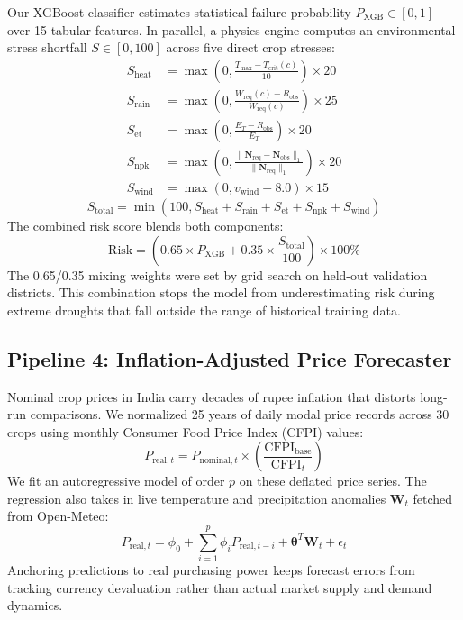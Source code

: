 \documentclass[conference]{IEEEtran}
\begin{document}
Our XGBoost classifier estimates statistical failure probability $P_{\text{XGB}} \in [0, 1]$ over 15 tabular features. In parallel, a physics engine computes an environmental stress shortfall $S \in [0, 100]$ across five direct crop stresses:
\begin{align}
S_{\text{heat}} &= \max\left(0, \frac{T_{\max} - T_{\text{crit}}(c)}{10}\right) \times 20 \\
S_{\text{rain}} &= \max\left(0, \frac{W_{\text{req}}(c) - R_{\text{obs}}}{W_{\text{req}}(c)}\right) \times 25 \\
S_{\text{et}}   &= \max\left(0, \frac{E_T - R_{\text{obs}}}{E_T}\right) \times 20 \\
S_{\text{npk}}  &= \max\left(0, \frac{\|\mathbf{N}_{\text{req}} - \mathbf{N}_{\text{obs}}\|_1}{\|\mathbf{N}_{\text{req}}\|_1}\right) \times 20 \\
S_{\text{wind}} &= \max\left(0, v_{\text{wind}} - 8.0\right) \times 15
\end{align}
\begin{equation}
S_{\text{total}} = \min(100, S_{\text{heat}} + S_{\text{rain}} + S_{\text{et}} + S_{\text{npk}} + S_{\text{wind}})
\end{equation}
The combined risk score blends both components:
\begin{equation}
\text{Risk} = \left(0.65 \times P_{\text{XGB}} + 0.35 \times \frac{S_{\text{total}}}{100}\right) \times 100\%
\end{equation}
The 0.65/0.35 mixing weights were set by grid search on held-out validation districts. This combination stops the model from underestimating risk during extreme droughts that fall outside the range of historical training data.

\subsection{Pipeline 4: Inflation-Adjusted Price Forecaster}
Nominal crop prices in India carry decades of rupee inflation that distorts long-run comparisons. We normalized 25 years of daily modal price records across 30 crops using monthly Consumer Food Price Index (CFPI) values:
\begin{equation}
P_{\text{real}, t} = P_{\text{nominal}, t} \times \left(\frac{\text{CFPI}_{\text{base}}}{\text{CFPI}_t}\right)
\end{equation}
We fit an autoregressive model of order $p$ on these deflated price series. The regression also takes in live temperature and precipitation anomalies $\mathbf{W}_t$ fetched from Open-Meteo:
\begin{equation}
P_{\text{real}, t} = \phi_0 + \sum_{i=1}^p \phi_i P_{\text{real}, t-i} + \boldsymbol{\theta}^T \mathbf{W}_t + \epsilon_t
\end{equation}
Anchoring predictions to real purchasing power keeps forecast errors from tracking currency devaluation rather than actual market supply and demand dynamics.
\end{document}
